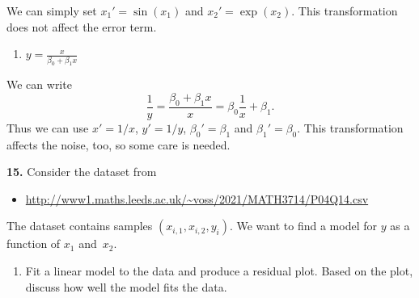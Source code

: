 \documentclass[
  a4paper,
]{article}
\providecommand{\tightlist}{%
  \setlength{\itemsep}{0pt}\setlength{\parskip}{0pt}}
\theoremstyle{definition}
\theoremstyle{definition}
\theoremstyle{definition}
\theoremstyle{definition}
\theoremstyle{remark}
\begin{document}
\begin{myanswers}
We can simply set \(x_1' = \sin(x_1)\) and \(x_2' = \exp(x_2)\).
This transformation does not affect the error term.

\end{myanswers}

\begin{enumerate}
\def\labelenumi{\alph{enumi}.}
\setcounter{enumi}{2}
\tightlist
\item
  \(y = \frac{x}{\beta_0 + \beta_1 x}\)
\end{enumerate}

\begin{myanswers}
We can write
\begin{equation*}
  \frac1y
  = \frac{\beta_0 + \beta_1 x}{x}
  = \beta_0 \frac1x + \beta_1.
\end{equation*}
Thus we can use \(x' = 1/x\), \(y' = 1/y\), \(\beta_0' = \beta_1\) and
\(\beta_1' = \beta_0\). This transformation affects the noise, too,
so some care is needed.

\end{myanswers}

\textbf{15.} Consider the dataset from

\begin{itemize}
\tightlist
\item
  \url{http://www1.maths.leeds.ac.uk/~voss/2021/MATH3714/P04Q14.csv}
\end{itemize}

The dataset contains samples \((x_{i,1}, x_{i,2}, y_i)\). We want to
find a model for \(y\) as a function of \(x_1\) and~\(x_2\).

\begin{enumerate}
\def\labelenumi{\alph{enumi}.}
\tightlist
\item
  Fit a linear model to the data and produce a residual plot.
  Based on the plot, discuss how well the model fits the data.
\end{enumerate}
\end{document}
